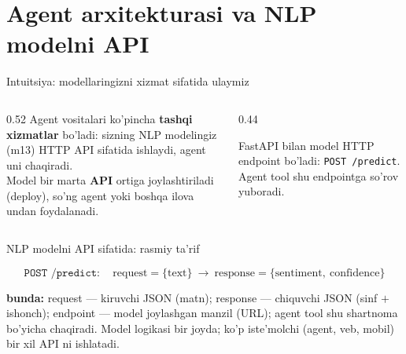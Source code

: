 \documentclass[aspectratio=169,11pt]{beamer}
\newcommand{\bunda}[1]{{\small\textbf{bunda:}\; #1}}
\begin{document}
\section[Arxitektura]{Agent arxitekturasi va NLP modelni API}

\begin{frame}{Intuitsiya: modellaringizni xizmat sifatida ulaymiz}
  \begin{columns}[T]
    \begin{column}{0.52\textwidth}
      \small
      Agent vositalari ko'pincha \textbf{tashqi xizmatlar} bo'ladi: sizning
      NLP modelingiz (m13) HTTP API sifatida ishlaydi, agent uni chaqiradi.\\[5pt]
      Model bir marta \textbf{API} ortiga joylashtiriladi (deploy), so'ng agent
      yoki boshqa ilova undan foydalanadi.
    \end{column}
    \begin{column}{0.44\textwidth}
      \begin{tcolorbox}[okbox,top=2pt,bottom=2pt]
        \footnotesize
        FastAPI bilan model HTTP endpoint bo'ladi: \texttt{POST /predict}.
        Agent tool shu endpointga so'rov yuboradi.
      \end{tcolorbox}
    \end{column}
  \end{columns}
\end{frame}

\begin{frame}{NLP modelni API sifatida: rasmiy ta'rif}
  \begin{tcolorbox}[defbox,title={Ta'rif: so'rov-javob shartnomasi}]
    \vspace{-0.4em}
    $$ \texttt{POST /predict}:\quad
       \text{request} = \{\text{text}\} \ \longrightarrow\
       \text{response} = \{\text{sentiment},\ \text{confidence}\} $$
  \end{tcolorbox}
  \vspace{2pt}
  \bunda{request --- kiruvchi JSON (matn); response --- chiquvchi JSON (sinf $+$
  ishonch); endpoint --- model joylashgan manzil (URL); agent tool shu shartnoma
  bo'yicha chaqiradi.}
  \vspace{4pt}
  \footnotesize Model logikasi bir joyda; ko'p iste'molchi (agent, veb, mobil)
  bir xil API ni ishlatadi.
\end{frame}
\end{document}

